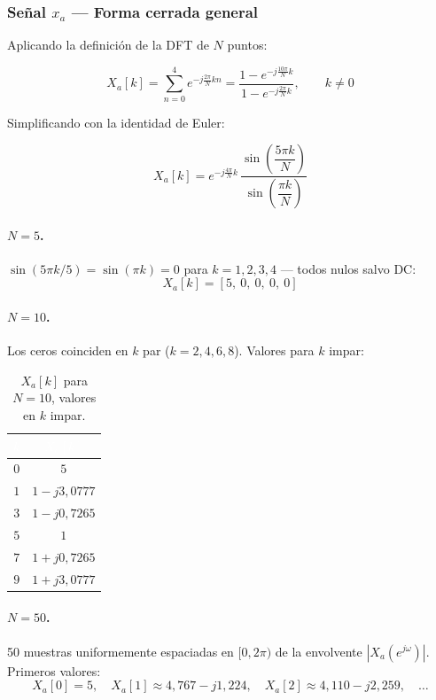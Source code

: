 \documentclass[../Main_Include.tex]{subfiles}
\begin{document}
\subsubsection*{Señal $x_a$ — Forma cerrada general}

Aplicando la definición de la DFT de $N$ puntos:

\[
    X_a[k] = \sum_{n=0}^{4} e^{-j\frac{2\pi}{N}kn}
    = \frac{1 - e^{-j\frac{10\pi}{N}k}}{1 - e^{-j\frac{2\pi}{N}k}},
    \qquad k \neq 0
\]

Simplificando con la identidad de Euler:

\[
    \boxed{X_a[k] = e^{-j\frac{4\pi}{N}k}\,
    \frac{\sin\!\left(\dfrac{5\pi k}{N}\right)}
         {\sin\!\left(\dfrac{\pi k}{N}\right)}}
\]

\paragraph{$N = 5$.}
$\sin(5\pi k/5) = \sin(\pi k) = 0$ para $k = 1,2,3,4$
— todos nulos salvo DC:
\[
    X_a[k] = [5,\ 0,\ 0,\ 0,\ 0]
\]

\paragraph{$N = 10$.}
Los ceros coinciden en $k$ par ($k = 2,4,6,8$). Valores para $k$ impar:

\begin{table}[H]
\centering
\renewcommand{\arraystretch}{1.4}
\begin{tabular}{cc}
\toprule
\rowcolor{azulprinc}
\textcolor{white}{\textbf{$k$}} &
\textcolor{white}{\textbf{$X_a[k]$}} \\
\midrule
\rowcolor{grisclaro}
$0$ & $5$ \\
$1$ & $1 - j3{,}0777$ \\
\rowcolor{grisclaro}
$3$ & $1 - j0{,}7265$ \\
$5$ & $1$ \\
\rowcolor{grisclaro}
$7$ & $1 + j0{,}7265$ \\
$9$ & $1 + j3{,}0777$ \\
\bottomrule
\end{tabular}
\caption{$X_a[k]$ para $N = 10$, valores en $k$ impar.}
\end{table}

\paragraph{$N = 50$.}
50 muestras uniformemente espaciadas en $[0, 2\pi)$ de la envolvente
$|X_a(e^{j\omega})|$. Primeros valores:
\[
    X_a[0] = 5, \quad
    X_a[1] \approx 4{,}767 - j1{,}224, \quad
    X_a[2] \approx 4{,}110 - j2{,}259, \quad \dots
\]
\end{document}
